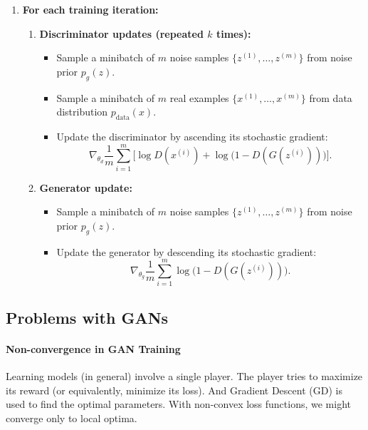 \documentclass[11pt]{article}
\begin{document}
\begin{enumerate}
	\item \textbf{For each training iteration:}
	      \begin{enumerate}
		      \item \textbf{Discriminator updates (repeated $k$ times):}
		            \begin{itemize}
			            \item Sample a minibatch of $m$ noise samples $\{ z^{(1)}, \ldots, z^{(m)} \}$ from noise prior $p_g(z)$.
			            \item Sample a minibatch of $m$ real examples $\{ x^{(1)}, \ldots, x^{(m)} \}$ from data distribution $p_{\text{data}}(x)$.
			            \item Update the discriminator by ascending its stochastic gradient:
			                  \[
				                  \nabla_{\theta_d} \frac{1}{m} \sum_{i=1}^{m}
				                  \Big[
					                  \log D(x^{(i)}) + \log \big(1 - D(G(z^{(i)}))\big)
					                  \Big].
			                  \]
		            \end{itemize}

		      \item \textbf{Generator update:}
		            \begin{itemize}
			            \item Sample a minibatch of $m$ noise samples $\{ z^{(1)}, \ldots, z^{(m)} \}$ from noise prior $p_g(z)$.
			            \item Update the generator by descending its stochastic gradient:
			                  \[
				                  \nabla_{\theta_g} \frac{1}{m} \sum_{i=1}^{m}
				                  \log \big(1 - D(G(z^{(i)}))\big).
			                  \]
		            \end{itemize}
	      \end{enumerate}
\end{enumerate}

\subsection*{Problems with GANs}
\paragraph*{Non-convergence in GAN Training}

Learning models (in general) involve a single player. The player tries to maximize its reward (or equivalently, minimize its loss). And Gradient Descent (GD) is used to find the optimal parameters.
With non-convex loss functions, we might converge only to local optima.
\end{document}
